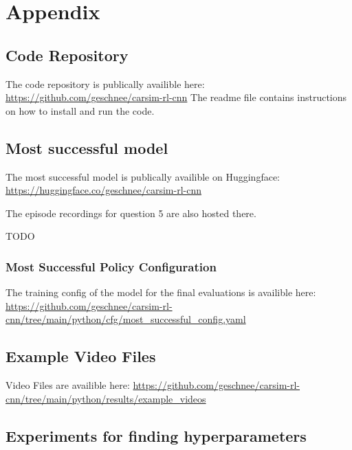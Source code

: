 \chapter{Appendix}
\label{cha:Appendix}

\section{Code Repository}

The code repository is publically availible here: \url{https://github.com/geschnee/carsim-rl-cnn}
The readme file contains instructions on how to install and run the code.

\section{Most successful model}

The most successful model is publically availible on Huggingface: \url{https://huggingface.co/geschnee/carsim-rl-cnn}

The episode recordings for question 5 are also hosted there.

TODO


\subsection{Most Successful Policy Configuration}
\label{cha:most_successful_config}

The training config of the model for the final evaluations is availible here: \url{https://github.com/geschnee/carsim-rl-cnn/tree/main/python/cfg/most_successful_config.yaml}

\section{Example Video Files}
\label{cha:example_videos}

Video Files are availible here: \url{https://github.com/geschnee/carsim-rl-cnn/tree/main/python/results/example_videos}




\section{Experiments for finding hyperparameters}

